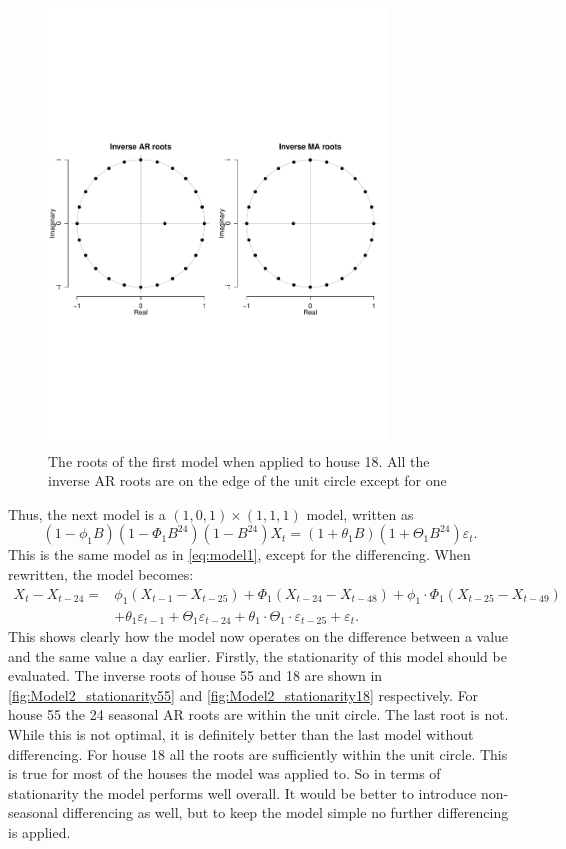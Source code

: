 \begin{figure}
    \centering
    \includegraphics[width=0.8\textwidth]{../../../figures/arimax/Stationarity_model1_18.pdf}
    \caption{The roots of the first model when applied to house 18. All the inverse AR roots are on the edge of the unit circle except for one}
    \label{fig:Model1_stationarity18}
\end{figure}
Thus, the next model is a $(1,0,1)\times(1,1,1)$ model, written as
\begin{equation}
    (1-\phi_1 B)(1-\Phi_1 B^{24})(1-B^{24})X_t = (1+\theta_1 B)(1+\Theta_1 B^{24}) \varepsilon_t.
\end{equation}
This is the same model as in \cref{eq:model1}, except for the differencing. When rewritten, the model becomes:
\begin{align}
    X_t-X_{t-24} = &\phi_1 (X_{t-1}-X_{t-25}) + \Phi_1 (X_{t-24}-X_{t-48}) + \phi_1 \cdot \Phi_1  (X_{t-25}-X_{t-49})\nonumber  \\  &+ \theta_1 \varepsilon_{t-1} + \Theta_1 \varepsilon_{t-24} + \theta_1 \cdot \Theta_1 \cdot \varepsilon_{t-25} + \varepsilon_t. \label{model101111}
\end{align}
This shows clearly how the model now operates on the difference between a value and the same value a day earlier. Firstly, the stationarity of this model should be evaluated. The inverse roots of house 55 and 18 are shown in \cref{fig:Model2_stationarity55} and \cref{fig:Model2_stationarity18} respectively. For house 55 the 24 seasonal AR roots are within the unit circle. The last root is not. While this is not optimal, it is definitely better than the last model without differencing. For house 18 all the roots are sufficiently within the unit circle. This is true for most of the houses the model was applied to. So in terms of stationarity the model performs well overall. It would be better to introduce non-seasonal differencing as well, but to keep the model simple no further differencing is applied.


